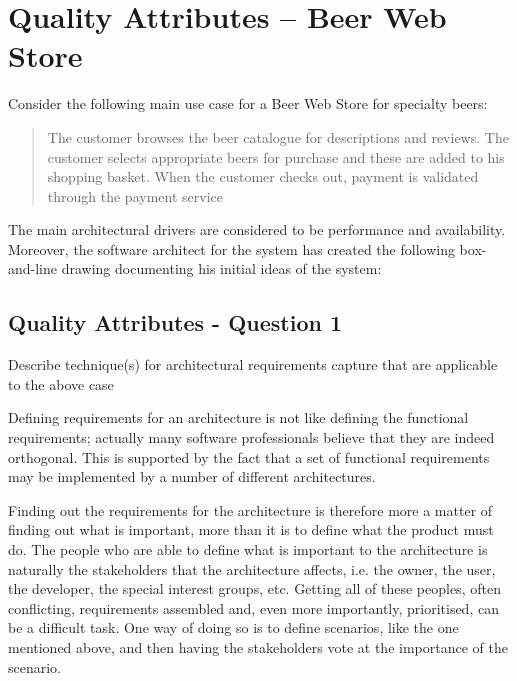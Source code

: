 \section{Quality Attributes -- Beer Web Store}

Consider the following main use case for a Beer Web Store for specialty
beers:

\begin{quote}
  The customer browses the beer catalogue for descriptions and
  reviews. The customer selects appropriate beers for purchase and
  these are added to his shopping basket. When the customer checks
  out, payment is validated through the payment service
\end{quote}
The main architectural drivers are considered to be performance and
availability. Moreover, the software architect for the system has
created the following box-and-line drawing documenting his initial
ideas of the system:
\begin{figure}[h!]
  \centerline{}
\end{figure}

\subsection{Quality Attributes - Question 1}

\begin{question}
Describe technique(s) for architectural requirements capture
that are applicable to the above case
\end{question}

Defining requirements for an architecture is not like defining the functional requirements; actually many software professionals believe that they are indeed orthogonal. This is supported by the fact that a set of functional requirements may be implemented by a number of different architectures.

Finding out the requirements for the architecture is therefore more a matter of finding out what is important, more than it is to define what the product must do. The people who are able to define what is important to the architecture is naturally the stakeholders that the architecture affects, i.e. the owner, the user, the developer, the special interest groups, etc. Getting all of these peoples, often conflicting, requirements assembled and, even more importantly, prioritised, can be a difficult task. One way of doing so is to define scenarios, like the one mentioned above, and then having the stakeholders vote at the importance of the scenario. 

